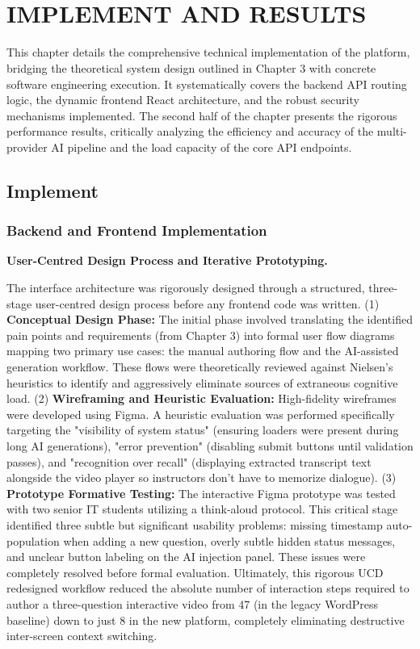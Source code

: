 \chapter{\\
IMPLEMENT AND RESULTS}

This chapter details the comprehensive technical implementation of the platform, bridging the theoretical system design outlined in Chapter 3 with concrete software engineering execution. It systematically covers the backend API routing logic, the dynamic frontend React architecture, and the robust security mechanisms implemented. The second half of the chapter presents the rigorous performance results, critically analyzing the efficiency and accuracy of the multi-provider AI pipeline and the load capacity of the core API endpoints.

\section{Implement}

\subsection{Backend and Frontend Implementation}

\textbf{User-Centred Design Process and Iterative Prototyping.}

The interface architecture was rigorously designed through a structured, three-stage user-centred design process before any frontend code was written. 
(1) \textbf{Conceptual Design Phase:} The initial phase involved translating the identified pain points and requirements (from Chapter 3) into formal user flow diagrams mapping two primary use cases: the manual authoring flow and the AI-assisted generation workflow. These flows were theoretically reviewed against Nielsen's heuristics to identify and aggressively eliminate sources of extraneous cognitive load.
(2) \textbf{Wireframing and Heuristic Evaluation:} High-fidelity wireframes were developed using Figma. A heuristic evaluation was performed specifically targeting the "visibility of system status" (ensuring loaders were present during long AI generations), "error prevention" (disabling submit buttons until validation passes), and "recognition over recall" (displaying extracted transcript text alongside the video player so instructors don't have to memorize dialogue).
(3) \textbf{Prototype Formative Testing:} The interactive Figma prototype was tested with two senior IT students utilizing a think-aloud protocol. This critical stage identified three subtle but significant usability problems: missing timestamp auto-population when adding a new question, overly subtle hidden status messages, and unclear button labeling on the AI injection panel. These issues were completely resolved before formal evaluation. Ultimately, this rigorous UCD redesigned workflow reduced the absolute number of interaction steps required to author a three-question interactive video from 47 (in the legacy WordPress baseline) down to just 8 in the new platform, completely eliminating destructive inter-screen context switching.

